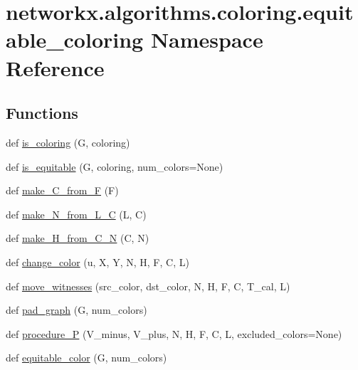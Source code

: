\hypertarget{namespacenetworkx_1_1algorithms_1_1coloring_1_1equitable__coloring}{}\section{networkx.\+algorithms.\+coloring.\+equitable\+\_\+coloring Namespace Reference}
\label{namespacenetworkx_1_1algorithms_1_1coloring_1_1equitable__coloring}
\subsection*{Functions}
\begin{DoxyCompactItemize}
\item 
def \hyperlink{namespacenetworkx_1_1algorithms_1_1coloring_1_1equitable__coloring_a18b64cc06a3c34def29e3cebdd5ae39b}{is\+\_\+coloring} (G, coloring)
\item 
def \hyperlink{namespacenetworkx_1_1algorithms_1_1coloring_1_1equitable__coloring_a78992108f3129c4f2264f8ee751e7f07}{is\+\_\+equitable} (G, coloring, num\+\_\+colors=None)
\item 
def \hyperlink{namespacenetworkx_1_1algorithms_1_1coloring_1_1equitable__coloring_a35fcfec63046b1b0949a6fddb59fb0b3}{make\+\_\+\+C\+\_\+from\+\_\+F} (F)
\item 
def \hyperlink{namespacenetworkx_1_1algorithms_1_1coloring_1_1equitable__coloring_aa7e8945e01ba6acd6329d30f839607eb}{make\+\_\+\+N\+\_\+from\+\_\+\+L\+\_\+C} (L, C)
\item 
def \hyperlink{namespacenetworkx_1_1algorithms_1_1coloring_1_1equitable__coloring_a62ed07b2920ac11ec7f1566a8dcca1d1}{make\+\_\+\+H\+\_\+from\+\_\+\+C\+\_\+N} (C, N)
\item 
def \hyperlink{namespacenetworkx_1_1algorithms_1_1coloring_1_1equitable__coloring_aecadac75147d649d7cb01e19e38ed1bb}{change\+\_\+color} (u, X, Y, N, H, F, C, L)
\item 
def \hyperlink{namespacenetworkx_1_1algorithms_1_1coloring_1_1equitable__coloring_a3389920a0828d701abbd6550d8e609a6}{move\+\_\+witnesses} (src\+\_\+color, dst\+\_\+color, N, H, F, C, T\+\_\+cal, L)
\item 
def \hyperlink{namespacenetworkx_1_1algorithms_1_1coloring_1_1equitable__coloring_ad564cd161c98e55b605760d7fc6c32e4}{pad\+\_\+graph} (G, num\+\_\+colors)
\item 
def \hyperlink{namespacenetworkx_1_1algorithms_1_1coloring_1_1equitable__coloring_ae77c7c09e94a019d26ad9302eb6a5004}{procedure\+\_\+P} (V\+\_\+minus, V\+\_\+plus, N, H, F, C, L, excluded\+\_\+colors=None)
\item 
def \hyperlink{namespacenetworkx_1_1algorithms_1_1coloring_1_1equitable__coloring_a763d70813a14904de18244af11ea73d5}{equitable\+\_\+color} (G, num\+\_\+colors)
\end{DoxyCompactItemize}


